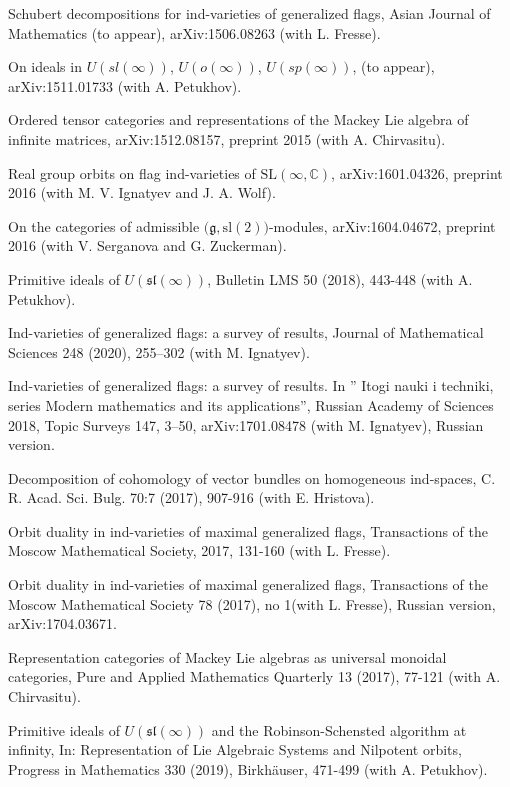 \documentclass[11pt]{amsart}
\begin{document}
\myss \label{66.} Schubert decompositions for ind-varieties of generalized flags, Asian Journal of Mathematics (to appear), arXiv:1506.08263 (with L. Fresse).

\myss \label{67.} On ideals in $U(sl(\infty))$, $U(o(\infty))$, $U(sp(\infty))$, (to appear),  arXiv:1511.01733  (with A. Petukhov).

\myss \label{68.} Ordered tensor categories and representations of the Mackey Lie
algebra of infinite matrices, arXiv:1512.08157, preprint 2015 (with A. Chirvasitu).

\myss \label{69.} Real group orbits on flag ind-varieties of $\mathrm{SL}(\infty,\mathbb{C})$, arXiv:1601.04326, preprint 2016 (with M. V. Ignatyev and J. A. Wolf).

\myss \label{70.}  On the categories of admissible $\big(\mathfrak{g},\mathrm{sl}(2)\big)$-modules, arXiv:1604.04672, preprint 2016 (with V. Serganova and G. Zuckerman).

\myss \label{71.}  Primitive ideals of $U(\mathfrak{sl}(\infty))$, Bulletin LMS 50 (2018), 443-448 (with A. Petukhov).

\myss \label{72.}  Ind-varieties of generalized flags: a survey of results, Journal of Mathematical Sciences 248 (2020), 255–302 (with M. Ignatyev).

\myss \label{72'.} Ind-varieties of generalized flags: a survey of results. In '' Itogi nauki i techniki, series Modern mathematics and its applications'',  Russian Academy of Sciences 2018, Topic Surveys 147, 3--50, arXiv:1701.08478 (with M. Ignatyev), Russian version.

\myss \label{73.} Decomposition of cohomology of vector bundles on homogeneous ind-spaces, C. R. Acad. Sci. Bulg. 70:7 (2017), 907-916 (with E. Hristova).

\myss \label{74.} Orbit duality in ind-varieties of maximal generalized flags, Transactions of the Moscow Mathematical Society, 2017, 131-160 (with L. Fresse).

\myss \label{74'.} Orbit duality in ind-varieties of maximal generalized flags, Transactions of the Moscow Mathematical Society 78 (2017), no 1(with L. Fresse), Russian version, arXiv:1704.03671.

\myss \label{75.} Representation categories of Mackey Lie algebras as universal monoidal categories, Pure and Applied Mathematics Quarterly 13 (2017), 77-121 (with A. Chirvasitu).

\myss \label{76.} Primitive ideals of $U(\mathfrak{sl}(\infty))$ and the Robinson-Schensted algorithm at infinity, In: Representation of Lie Algebraic Systems and Nilpotent orbits, Progress in Mathematics 330 (2019), Birkhäuser, 471-499 (with A. Petukhov).
\end{document}
